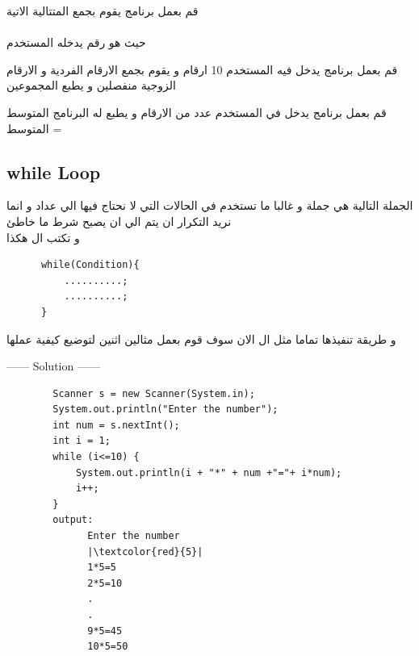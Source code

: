 \begin{task}
  \begin{AR}
    قم بعمل برنامج يقوم بجمع المتتالية الاتية 
    \\
    \\
    حيث  هو رقم يدخله المستخدم
  \end{AR}
\end{task}
\begin{task}
  \begin{AR}
    قم بعمل برنامج يدخل فيه المستخدم 10 ارقام و يقوم بجمع الارقام الفردية 
    و الارقام الزوجية منفصلين و يطبع المجموعين
  \end{AR}
\end{task}
\begin{task}
  \begin{AR}
    قم بعمل برنامج يدخل في المستخدم عدد من الارقام و يطبع له البرنامج المتوسط 
    \\
    المتوسط =
  \end{AR}
\end{task}
\newpage
\subsection{while Loop}
\begin{AR}
  الجملة التالية هي جملة  و غالبا ما تستخدم في الحالات التي لا نحتاج فيها الي عداد و انما 
  نريد التكرار ان يتم الي ان يصبح شرط ما خاطئ\\
  و تكتب ال  هكذا 
\end{AR}
  \begin{verbatim}
      while(Condition){
          ..........;
          ..........;
      }
  \end{verbatim}
\begin{AR}
  و طريقة تنفيذها تماما مثل ال  الان سوف قوم بعمل مثالين اثنين لتوضيع كيفية عملها
\end{AR}
\begin{example}
              
  \begin{center}
    ------ \textcolor{Solution}{Solution} ------ 
  \end{center}
  \begin{verbatim}
        Scanner s = new Scanner(System.in);
        System.out.println("Enter the number");
        int num = s.nextInt();
        int i = 1;
        while (i<=10) {            
            System.out.println(i + "*" + num +"="+ i*num);
            i++;
        }
        output:
              Enter the number
              |\textcolor{red}{5}|
              1*5=5
              2*5=10
              .
              .
              9*5=45
              10*5=50
  \end{verbatim}
\end{example}

